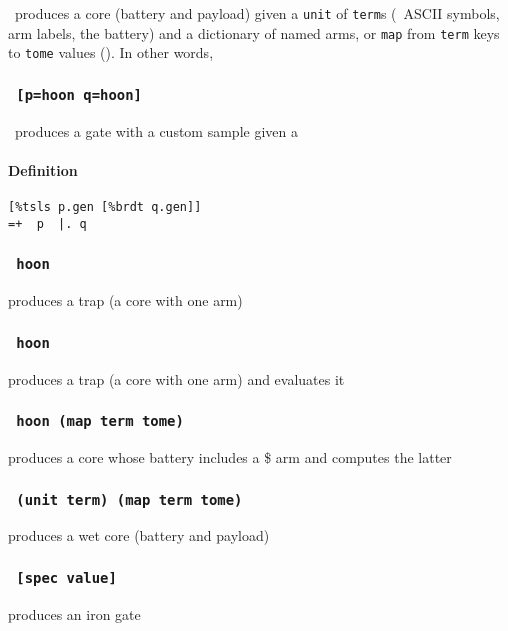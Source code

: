 \pbarcab~produces a core (battery and payload) given a \texttt{unit} of \texttt{term}s (\pattas~ASCII symbols, arm labels, the battery) and a dictionary of named arms, or \texttt{map} from \texttt{term} keys to \texttt{tome} values ().  In other words,


\subsubsection{\textbf{\barcol\texttt{~[p=hoon q=hoon]}}}
\label{ap:barcol}

\pbarcol~produces a gate with a custom sample given a

\paragraph{Definition}

\begin{lstlisting}
[%tsls p.gen [%brdt q.gen]]
=+  p  |. q
\end{lstlisting}

\subsubsection{\textbf{\bardot\texttt{~hoon}}}
\label{ap:bardot}
produces a trap (a core with one arm)

\subsubsection{\textbf{\barhep\texttt{~hoon}}}
\label{ap:barcen}
produces a trap (a core with one arm) and evaluates it

\subsubsection{\textbf{\barket\texttt{~hoon (map term tome)}}}
\label{ap:barcen}
produces a core whose battery includes a \$ arm and computes the latter

\subsubsection{\textbf{\barpat\texttt{~(unit term) (map term tome)}}}
\label{ap:barpat}
produces a wet core (battery and payload)

\subsubsection{\textbf{\barsig\texttt{~[spec value]}}}
\label{ap:barcen}
produces an iron gate

